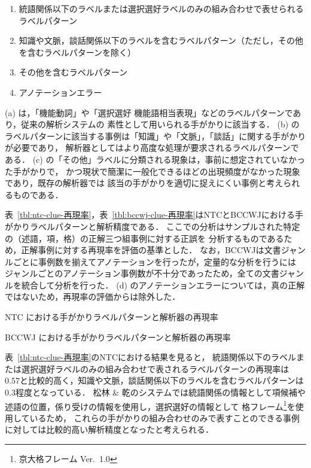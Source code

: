 \documentclass[japanese]{jnlp_1.4}
\begin{document}
{\makeatletter
\renewcommand{\theenumi}{}
\begin{enumerate}
    \item 統語関係以下のラベルまたは選択選好ラベルのみの組み合わせで表せられるラベルパターン
    \item 知識や文脈，談話関係以下のラベルを含むラベルパターン（ただし，その他を含むラベルパターンを除く）
    \item その他を含むラベルパターン
    \item アノテーションエラー
\end{enumerate}
\makeatother}

(a) は，「機能動詞」や「選択選好 機能語相当表現」などのラベルパターンであり，従来の解析システムの
素性として用いられる手がかりに該当する．
(b) のラベルパターンに該当する事例は「知識」や「文脈」，「談話」に関する手がかりが必要であり，
解析器としてはより高度な処理が要求されるラベルパターンである．
(c) の「その他」ラベルに分類される現象は，事前に想定されていなかった手がかりで，
かつ現状で簡潔に一般化できるほどの出現頻度がなかった現象であり，既存の解析器では
該当の手がかりを適切に捉えにくい事例と考えられるものである．

表~\ref{tbl:ntc-clue-再現率}，表~\ref{tbl:bccwj-clue-再現率}はNTCとBCCWJにおける手がかりラベルパターンと解析精度である．
ここでの分析はサンプルされた特定の（述語，項，格）の正解三つ組事例に対する正誤を
分析するものであるため，正解事例に対する再現率を評価の基準とした．
なお，BCCWJは文書ジャンルごとに事例数を揃えてアノテーションを行ったが，定量的な分析を行うには
ジャンルごとのアノテーション事例数が不十分であったため，全ての文書ジャンルを統合して分析を行った．
(d) のアノテーションエラーについては，真の正解ではないため，再現率の評価からは除外した．

\begin{table}[t]
\caption{NTC における手がかりラベルパターンと解析器の再現率}
\label{tbl:ntc-clue-再現率}

\end{table}
\begin{table}[t]
\caption{BCCWJ における手がかりラベルパターンと解析器の再現率}
\label{tbl:bccwj-clue-再現率}

\end{table}

表~\ref{tbl:ntc-clue-再現率}のNTCにおける結果を見ると，
統語関係以下のラベルまたは選択選好ラベルのみの組み合わせで表されるラベルパターンの再現率は
$0.57$と比較的高く，知識や文脈，談話関係以下のラベルを含むラベルパターンは$0.3$程度となっている．
松林 \& 乾のシステムでは統語関係の情報として項候補や述語の位置，係り受けの情報を使用し，選択選好の情報として
格フレーム\footnote{京大格フレーム Ver.~1.0}を使用しているため，
これらの手がかりの組み合わせのみで表すことのできる事例に対しては比較的高い解析精度となったと考えられる．
\end{document}
